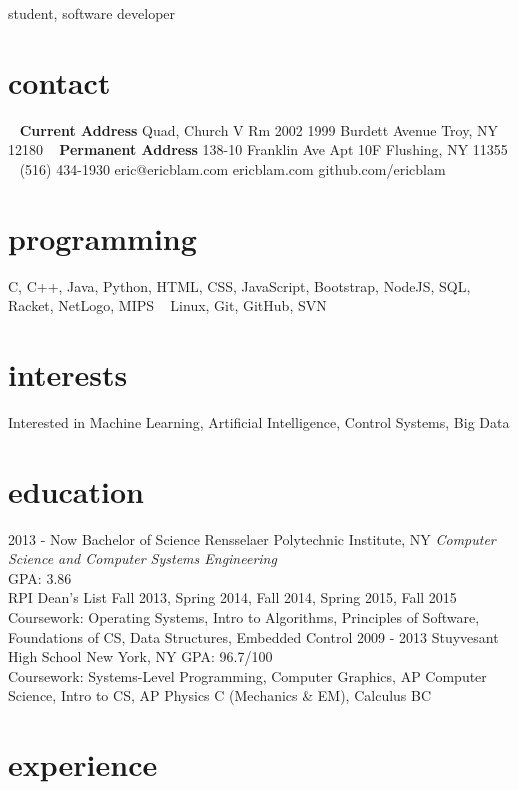 \documentclass[]{friggeri-cv}
\begin{document}
       {student, software developer}


\begin{aside}
  \section{contact}
    ~
    \textbf{Current Address}
    Quad, Church V
    Rm 2002
    1999 Burdett Avenue
    Troy, NY 12180
    ~
    \textbf{Permanent Address}
    138-10 Franklin Ave
    Apt 10F
    Flushing, NY 11355
    ~
    (516) 434-1930
    eric@ericblam.com
    ericblam.com
    github.com/ericblam
  \section{programming}
    C, C++, Java, Python, HTML, CSS, JavaScript, Bootstrap, NodeJS, SQL, Racket, NetLogo, MIPS
    ~
    Linux, Git, GitHub, SVN
\end{aside}

\section{interests}

Interested in Machine Learning, Artificial Intelligence, Control Systems, Big Data

\section{education}

\begin{entrylist}
  \entry
    {2013 - Now}
    {Bachelor of Science}
    {Rensselaer Polytechnic Institute, NY}
    {\emph{Computer Science and Computer Systems Engineering}\\
    GPA: 3.86\\
    RPI Dean's List Fall 2013, Spring 2014, Fall 2014, Spring 2015, Fall 2015\\
    Coursework: Operating Systems, Intro to Algorithms, Principles of Software, Foundations of CS, Data Structures, Embedded Control}
  \entry
    {2009 - 2013}
    {Stuyvesant High School}
    {New York, NY}
    {GPA: 96.7/100\\
    Coursework: Systems-Level Programming, Computer Graphics, AP Computer Science, Intro to CS, AP Physics C (Mechanics \& EM), Calculus BC}
\end{entrylist}

\section{experience}
\end{document}
